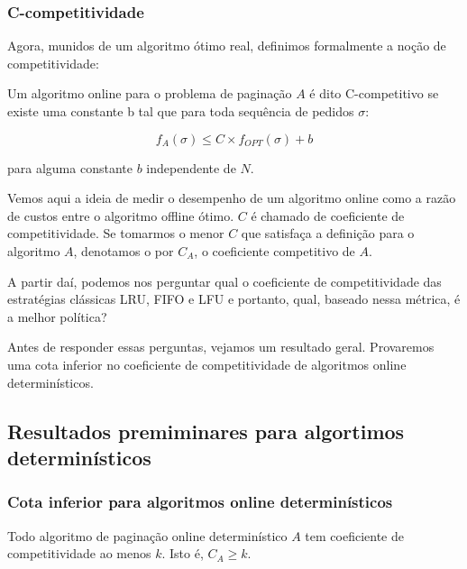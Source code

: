 \documentclass[a4paper,oneside,reqno,12pt]{amsart}
\begin{document}
\subsubsection{C-competitividade}

Agora, munidos de um algoritmo ótimo real, definimos formalmente a noção de competitividade:

\begin{definition}
Um algoritmo online para o problema de paginação $A$ é dito C-competitivo se existe uma constante b tal que para toda sequência de pedidos $\sigma$:

\[f_A(\sigma) \leqslant C \times f_{OPT}(\sigma) + b\]

para alguma constante $b$ independente de $N$.
\end{definition}

Vemos aqui a ideia de medir o desempenho de um algoritmo online como a razão de custos entre o algoritmo offline ótimo. $C$ é chamado de coeficiente de competitividade. Se tomarmos o menor $C$ que satisfaça a definição para o algoritmo $A$, denotamos o por $C_A$, o coeficiente competitivo de $A$.

A partir daí, podemos nos perguntar qual o coeficiente de competitividade das estratégias clássicas LRU, FIFO e LFU e portanto, qual, baseado nessa métrica, é a melhor política?

Antes de responder essas perguntas, vejamos um resultado geral. Provaremos uma cota inferior no coeficiente de competitividade de algoritmos online determinísticos.

\subsection{Resultados premiminares para algortimos determinísticos}

\subsubsection{Cota inferior para algoritmos online determinísticos}

\begin{theorem}
\label{teorema1}
Todo algoritmo de paginação online determinístico $A$ tem coeficiente de competitividade ao menos $k$. Isto é, $C_A \geqslant k$.
\end{theorem}
\end{document}
